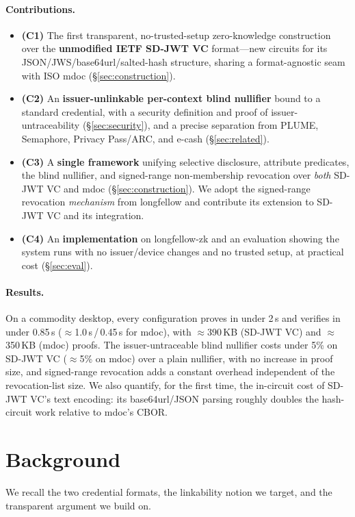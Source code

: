 \documentclass[11pt]{article}
\theoremstyle{plain}
\theoremstyle{definition}
\begin{document}
\paragraph{Contributions.}
\begin{itemize}
\item \textbf{(C1)} The first transparent, no-trusted-setup zero-knowledge
construction over the \textbf{unmodified IETF SD-JWT VC} format---new circuits for its
JSON/JWS/base64url/salted-hash structure, sharing a format-agnostic seam with ISO
mdoc (\S\ref{sec:construction}).
\item \textbf{(C2)} An \textbf{issuer-unlinkable per-context blind nullifier} bound to
a standard credential, with a security definition and proof of issuer-untraceability
(\S\ref{sec:security}), and a precise separation from PLUME, Semaphore, Privacy
Pass/ARC, and e-cash (\S\ref{sec:related}).
\item \textbf{(C3)} A \textbf{single framework} unifying selective disclosure,
attribute predicates, the blind nullifier, and signed-range non-membership revocation
over \emph{both} SD-JWT VC and mdoc (\S\ref{sec:construction}). We adopt the
signed-range revocation \emph{mechanism} from longfellow and contribute its extension
to SD-JWT VC and its integration.
\item \textbf{(C4)} An \textbf{implementation} on longfellow-zk and an evaluation
showing the system runs with no issuer/device changes and no trusted setup, at
practical cost (\S\ref{sec:eval}).
\end{itemize}

\paragraph{Results.}
On a commodity desktop, every configuration proves in under 2\,s and verifies in
under 0.85\,s ($\approx$1.0\,s\,/\,0.45\,s for mdoc), with $\approx$390\,KB (SD-JWT VC)
and $\approx$350\,KB (mdoc) proofs. The issuer-untraceable blind nullifier costs under
5\% on SD-JWT VC ($\approx$5\% on mdoc) over a plain nullifier, with no increase in proof size, and signed-range revocation
adds a constant overhead independent of the revocation-list size. We also quantify,
for the first time, the in-circuit cost of SD-JWT VC's text encoding: its
base64url/JSON parsing roughly doubles the hash-circuit work relative to mdoc's CBOR.

\section{Background}\label{sec:background}
We recall the two credential formats, the linkability notion we target, and the
transparent argument we build on.
\end{document}
